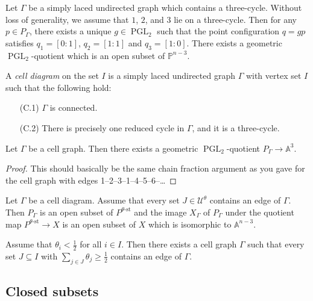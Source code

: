 \documentclass[11pt, a4paper]{amsart}
\begin{document}
	\begin{rem}
		Let \(\Gamma\) be a simply laced undirected graph which contains a three-cycle. 
		Without loss of generality, we assume that \(1\), \(2\), and \(3\) lie on a three-cycle. 
		Then for any \(p \in P_\Gamma\), there exists a unique \(g \in \operatorname{PGL}_2\) such that the point configuration \(q = gp\) satisfies \(q_1 = [0:1]\), \(q_2 = [1:1]\) and \(q_3 = [1:0]\). 
		There exists a geometric \(\operatorname{PGL}_2\)-quotient which is an open subset of \(\mathbb{P}^{n-3}\).
	\end{rem}

	\begin{defn}
		A \emph{cell diagram} on the set \(I\) is a simply laced undirected graph \(\Gamma\) with vertex set \(I\) such that the following hold:
		\begin{enumerate}
			\item[(C.1)] \(\Gamma\) is connected.
			\item[(C.2)] There is precisely one reduced cycle in \(\Gamma\), and it is a three-cycle. 
		\end{enumerate}
	\end{defn}

	\begin{lem}
		Let \(\Gamma\) be a cell graph. 
		Then there exists a geometric \(\operatorname{PGL}_2\)-quotient \(P_{\Gamma} \to \mathbb{A}^3\).
	\end{lem}

	\begin{proof}
		This should basically be the same chain fraction argument as you gave for the cell graph with edges 1--2--3--1--4--5--6--\ldots
	\end{proof}

	Let \(\Gamma\) be a cell diagram. 
	Assume that every set \(J \in \mathcal{U}^\theta\) contains an edge of \(\Gamma\). 
	Then \(P_\Gamma\) is an open subset of \(P^{\theta\text{-st}}\) and the image \(X_\Gamma\) of \(P_\Gamma\) under the quotient map \(P^{\theta\text{-st}} \to X\) is an open subset of \(X\) which is isomorphic to \(\mathbb{A}^{n-3}\).

	\begin{claim}
		Assume that \(\theta_i < \frac{1}{2}\) for all \(i \in I\). 
		Then there exists a cell graph \(\Gamma\) such that every set \(J \subseteq I\) with \(\sum_{j \in J} \theta_j \geq \frac{1}{2}\) contains an edge of \(\Gamma\).
	\end{claim}

	\subsection*{Closed subsets}
	
\end{document}
